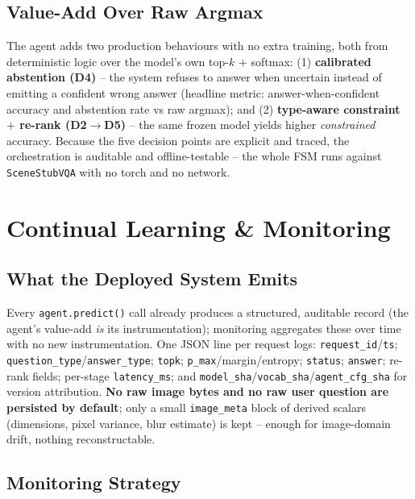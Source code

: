 \documentclass[12pt,a4paper]{article}
\begin{document}
\subsection{Value-Add Over Raw Argmax}

The agent adds two production behaviours with no extra training, both from deterministic logic over the model's own top-$k$ $+$ softmax: (1) \textbf{calibrated abstention (D4)} -- the system refuses to answer when uncertain instead of emitting a confident wrong answer (headline metric: answer-when-confident accuracy and abstention rate vs raw argmax); and (2) \textbf{type-aware constraint $+$ re-rank (D2$\rightarrow$D5)} -- the same frozen model yields higher \emph{constrained} accuracy. Because the five decision points are explicit and traced, the orchestration is auditable and offline-testable -- the whole FSM runs against \texttt{SceneStubVQA} with no torch and no network.

\section{Continual Learning \& Monitoring}

\subsection{What the Deployed System Emits}

Every \texttt{agent.predict()} call already produces a structured, auditable record (the agent's value-add \emph{is} its instrumentation); monitoring aggregates these over time with no new instrumentation. One JSON line per request logs: \texttt{request\_id}/\texttt{ts}; \texttt{question\_type}/\texttt{answer\_type}; \texttt{topk}; \texttt{p\_max}/margin/entropy; \texttt{status}; \texttt{answer}; re-rank fields; per-stage \texttt{latency\_ms}; and \texttt{model\_sha}/\texttt{vocab\_sha}/\texttt{agent\_cfg\_sha} for version attribution. \textbf{No raw image bytes and no raw user question are persisted by default}; only a small \texttt{image\_meta} block of derived scalars (dimensions, pixel variance, blur estimate) is kept -- enough for image-domain drift, nothing reconstructable.

\subsection{Monitoring Strategy}
\end{document}
